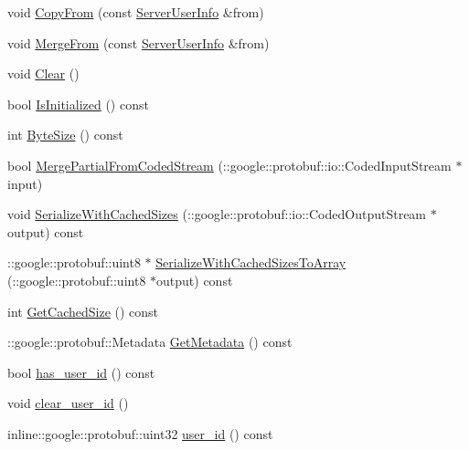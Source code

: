 \begin{DoxyCompactItemize}
void \hyperlink{class_i_m_1_1_base_define_1_1_server_user_info_aac9785904aa157320b8adf99c683091f}{Copy\+From} (const \hyperlink{class_i_m_1_1_base_define_1_1_server_user_info}{Server\+User\+Info} \&from)
\item 
void \hyperlink{class_i_m_1_1_base_define_1_1_server_user_info_a420385348152b14252f6e45b032b2584}{Merge\+From} (const \hyperlink{class_i_m_1_1_base_define_1_1_server_user_info}{Server\+User\+Info} \&from)
\item 
void \hyperlink{class_i_m_1_1_base_define_1_1_server_user_info_abed8991a4a8ffc7f742c34685521db66}{Clear} ()
\item 
bool \hyperlink{class_i_m_1_1_base_define_1_1_server_user_info_adf89b4001f4c5b55663cfe2bc1e27ec6}{Is\+Initialized} () const 
\item 
int \hyperlink{class_i_m_1_1_base_define_1_1_server_user_info_a42b8932777dd3b2bbc721c45dd789697}{Byte\+Size} () const 
\item 
bool \hyperlink{class_i_m_1_1_base_define_1_1_server_user_info_a0d64aa8ffdea20c69ec993d0fdf138c2}{Merge\+Partial\+From\+Coded\+Stream} (\+::google\+::protobuf\+::io\+::\+Coded\+Input\+Stream $\ast$input)
\item 
void \hyperlink{class_i_m_1_1_base_define_1_1_server_user_info_a79ce170b5260c9c512d6f4b9da6f7838}{Serialize\+With\+Cached\+Sizes} (\+::google\+::protobuf\+::io\+::\+Coded\+Output\+Stream $\ast$output) const 
\item 
\+::google\+::protobuf\+::uint8 $\ast$ \hyperlink{class_i_m_1_1_base_define_1_1_server_user_info_acfae7b4707e7329ca35d8466ae6229b5}{Serialize\+With\+Cached\+Sizes\+To\+Array} (\+::google\+::protobuf\+::uint8 $\ast$output) const 
\item 
int \hyperlink{class_i_m_1_1_base_define_1_1_server_user_info_afb4b6986ce59621b39d69e4d149589aa}{Get\+Cached\+Size} () const 
\item 
\+::google\+::protobuf\+::\+Metadata \hyperlink{class_i_m_1_1_base_define_1_1_server_user_info_a7184679e1ec73924cf1b16990b8661af}{Get\+Metadata} () const 
\item 
bool \hyperlink{class_i_m_1_1_base_define_1_1_server_user_info_a3af9cd2d28e116e451354adc08544c59}{has\+\_\+user\+\_\+id} () const 
\item 
void \hyperlink{class_i_m_1_1_base_define_1_1_server_user_info_ae6d22245c9118ff81716c8788066483f}{clear\+\_\+user\+\_\+id} ()
\item 
inline\+::google\+::protobuf\+::uint32 \hyperlink{class_i_m_1_1_base_define_1_1_server_user_info_a4b95297e603409312543b45d1a69a4cd}{user\+\_\+id} () const 

\end{DoxyCompactItemize}
